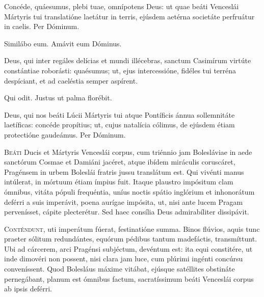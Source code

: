 \begin{caputFesti}
\end{caputFesti}

\parsOratio

Concéde, quáesumus,
plebi tuae, omnípotens Deus:
ut quae beáti Venceslái Mártyris tui translatióne laetátur in terris,
ejúsdem aetérna societáte perfruátur in caelis.
Per Dóminum.

Similábo eum.
Amávit eum Dóminus.

\parsOratio

Deus, qui inter regáles delícias et mundi illécebras,
sanctum Casimírum virtúte constántiae roborásti:
quaésumus;
ut, ejus intercessióne, fidéles tui terréna despíciant,
et ad caeléstia semper aspírent.

Qui odit.
Justus ut palma florébit.

\parsOratio

Deus, qui nos beáti Lúcii Mártyris tui atque Pontíficis
ánnua sollemnitáte laetíficas:
concéde propítius;
ut, cujus natalícia cólimus,
de ejúsdem étiam protectióne gaudeámus.
Per Dóminum.

\horaNocturnusII


\lettrine{B}{eáti} Ducis et Mártyris Venceslái corpus,
cum triénnio jam Bolesláviae in aede sanctórum Cosmae et Damiáni jacéret,
atque ibídem miráculis coruscáret,
Pragénsem in urbem Boleslái fratris jussu translátum est.
Qui vivénti manus intúlerat, in mórtuum étiam ímpius fuit.
Itaque plaustro impósitum clam ómnibus,
vitáta pópuli frequéntia, uníus noctis spátio
inglórium et inhonorátum deférri a suis imperávit,
poena aurígae impósita,
ut, nisi ante lucem Pragam pervenísset, cápite plecterétur.
Sed haec consília Deus admirabíliter dissipávit.



\lettrine{C}{onténdunt,} uti imperátum fúerat, festinatióne summa.
Binos flúvios, aquis tunc praeter sólitum redundántes,
equórum pédibus tantum madefáctis, transmíttunt.
Ubi ad cárcerem, arci Pragénsi subjéctum, devéntum est:
ita equi constitére, ut inde dimovéri non possent,
nisi clara jam luce, cum plúrimi ingénti concúrsu conveníssent.
Quod Bolesláus máxime vitábat, ejúsque satéllites obstináte
pernegábant, planum est ómnibus factum, sacratíssimum beáti
Venceslái corpus ab ipsis deférri.

